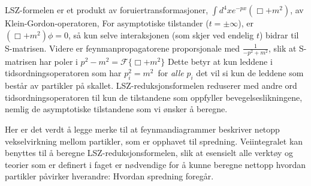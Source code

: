 \documentclass{article}
\newcommand{\F}[1]{\mathcal{F}\{{#1}\}}
\newcommand{\KG}{\Box + m^2}
\begin{document}
LSZ-formelen er et produkt av foruiertransformasjoner, $\int d^4x e^{-px}(\KG)$, av Klein-Gordon-operatoren, 
For asymptotiske tilstander ($t = \pm \infty$), er $(\Box + m^2)\phi = 0$, så kun selve interaksjonen (som skjer ved endelig $t$) bidrar til S-matrisen.
Videre er feynmanpropagatorene proporsjonale med $\frac{1}{-p^2 + m^2}$, slik at S-matrisen har poler i $p^2 - m^2 = \F{\KG}$
Dette betyr at kun leddene i tidsordningsoperatoren som har $p_i^2 = m^2$ for \emph{alle} $p_i$ det vil si kun de leddene som består av partikler på skallet.
LSZ-reduksjonsformelen reduserer med andre ord tidsordningsoperatoren til kun de tilstandene som oppfyller bevegelseslikningene, nemlig de asymptotiske tilstandene som vi ønsker å beregne.

Her er det verdt å legge merke til at feynmandiagrammer beskriver netopp vekselvirkning mellom partikler, som er opphavet til spredning.
Veiintegralet kan benyttes til å beregne LSZ-reduksjonsformelen, slik at esensielt alle verktøy og teorier som er definert i faget er nødvendige for å kunne beregne nettopp hvordan partikler påvirker hverandre:
Hvordan spredning foregår.
\end{document}

